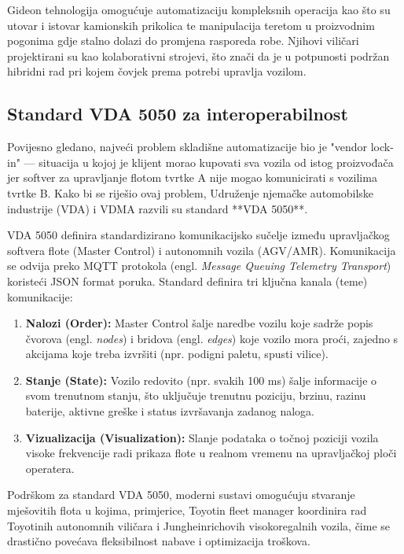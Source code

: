 Gideon tehnologija omogućuje automatizaciju kompleksnih operacija kao što su utovar i istovar kamionskih prikolica te manipulacija teretom u proizvodnim pogonima gdje stalno dolazi do promjena rasporeda robe. Njihovi viličari projektirani su kao kolaborativni strojevi, što znači da je u potpunosti podržan hibridni rad pri kojem čovjek prema potrebi upravlja vozilom.

\subsection{Standard VDA 5050 za interoperabilnost}
Povijesno gledano, najveći problem skladišne automatizacije bio je "vendor lock-in" — situacija u kojoj je klijent morao kupovati sva vozila od istog proizvođača jer softver za upravljanje flotom tvrtke A nije mogao komunicirati s vozilima tvrtke B. Kako bi se riješio ovaj problem, Udruženje njemačke automobilske industrije (VDA) i VDMA razvili su standard **VDA 5050**.

VDA 5050 definira standardizirano komunikacijsko sučelje između upravljačkog softvera flote (Master Control) i autonomnih vozila (AGV/AMR). Komunikacija se odvija preko MQTT protokola (engl. \textit{Message Queuing Telemetry Transport}) koristeći JSON format poruka. Standard definira tri ključna kanala (teme) komunikacije:
\begin{enumerate}
    \item \textbf{Nalozi (Order):} Master Control šalje naredbe vozilu koje sadrže popis čvorova (engl. \textit{nodes}) i bridova (engl. \textit{edges}) koje vozilo mora proći, zajedno s akcijama koje treba izvršiti (npr. podigni paletu, spusti vilice).
    \item \textbf{Stanje (State):} Vozilo redovito (npr. svakih 100 ms) šalje informacije o svom trenutnom stanju, što uključuje trenutnu poziciju, brzinu, razinu baterije, aktivne greške i status izvršavanja zadanog naloga.
    \item \textbf{Vizualizacija (Visualization):} Slanje podataka o točnoj poziciji vozila visoke frekvencije radi prikaza flote u realnom vremenu na upravljačkoj ploči operatera.
\end{enumerate}
Podrškom za standard VDA 5050, moderni sustavi omogućuju stvaranje mješovitih flota u kojima, primjerice, Toyotin fleet manager koordinira rad Toyotinih autonomnih viličara i Jungheinrichovih visokoregalnih vozila, čime se drastično povećava fleksibilnost nabave i optimizacija troškova.
